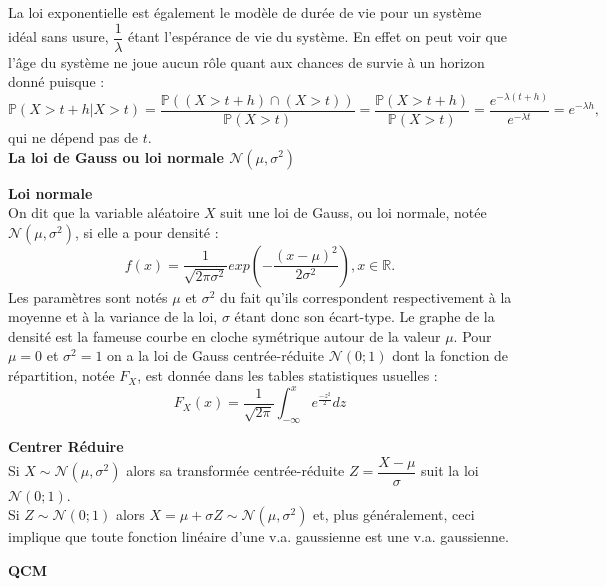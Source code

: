 \documentclass[../PolyS4.tex]{subfiles}
\begin{document}
La loi exponentielle est également le modèle de durée de vie pour un système idéal sans usure, $\dfrac{1}{\lambda}$ étant l'espérance de vie du système. En effet on peut voir que l'âge du système ne joue aucun rôle quant aux chances de survie à un horizon donné puisque :
$$\mathbb{P}(X >t + h|X >t) =
\dfrac{\mathbb{P}((X >t + h) \cap (X >t))}{\mathbb{P}(X >t)}
=\dfrac{\mathbb{P}(X >t + h)}{\mathbb{P}(X >t)}=\dfrac{
e^{-\lambda(t+h)}}{e^{-\lambda t}} = e^{-\lambda h} ,$$
qui ne dépend pas de $t$.\\

\textbf{ La loi de Gauss ou loi normale $\mathcal{N}(\mu,\sigma^2)$}

\begin{Def}\textbf{Loi normale}\\
On dit que la variable aléatoire $X$ suit une loi de Gauss, ou loi normale,
notée $\mathcal{N}(\mu, \sigma^2)$, si elle a pour densité :
$$f(x) =\dfrac{1}{\sqrt{2 \pi \sigma^2}} exp\left(  -\dfrac{(x-\mu)^2}{2\sigma^2}\right), x \in \mathbb{R} .$$
Les paramètres sont notés $\mu$ et $\sigma^2$ du fait qu'ils correspondent respectivement à la moyenne et à la variance de la loi, $\sigma$ étant donc son écart-type. Le graphe de la densité est la fameuse courbe en cloche symétrique autour de la valeur $\mu$.
Pour $\mu = 0$ et $\sigma^2 = 1$ on a la loi de Gauss centrée-réduite $\mathcal{N}(0 ; 1)$ dont la fonction de répartition, notée $F_X$, est donnée dans les tables statistiques usuelles :
$$F_X(x) =\dfrac{1}{\sqrt{2 \pi}}\int_{-\infty}^x e^{\frac{-z^2}{2}} dz$$
\end{Def}

\begin{Prop}{\textbf{Centrer Réduire}}\\
Si $X \sim \mathcal{N}(\mu, \sigma^2)$ alors sa transformée centrée-réduite $Z = \dfrac{X-\mu}{\sigma} $ suit la loi $\mathcal{N}(0 ; 1)$.\\
Si $Z \sim \mathcal{N}(0 ; 1)$ alors $X = \mu+\sigma Z \sim \mathcal{N}(\mu, \sigma^2)$ et, plus généralement, ceci implique que toute fonction linéaire d'une v.a. gaussienne est une v.a. gaussienne.\\
\end{Prop}


\textbf{QCM}
\end{document}
